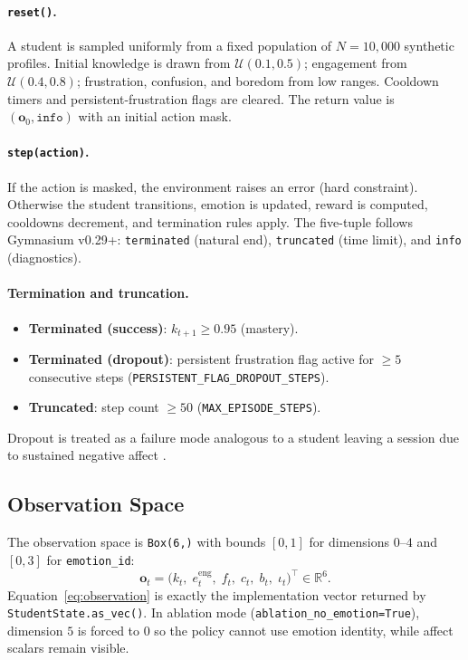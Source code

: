\paragraph{\texttt{reset()}.}
A student is sampled uniformly from a fixed population of $N=10{,}000$ synthetic profiles. Initial knowledge is drawn from $\mathcal{U}(0.1, 0.5)$; engagement from $\mathcal{U}(0.4, 0.8)$; frustration, confusion, and boredom from low ranges. Cooldown timers and persistent-frustration flags are cleared. The return value is $(\mathbf{o}_0, \texttt{info})$ with an initial action mask.

\paragraph{\texttt{step(action)}.}
If the action is masked, the environment raises an error (hard constraint). Otherwise the student transitions, emotion is updated, reward is computed, cooldowns decrement, and termination rules apply. The five-tuple follows Gymnasium v0.29+: \texttt{terminated} (natural end), \texttt{truncated} (time limit), and \texttt{info} (diagnostics).

\paragraph{Termination and truncation.}
\begin{itemize}
    \item \textbf{Terminated (success)}: $k_{t+1} \geq 0.95$ (mastery).
    \item \textbf{Terminated (dropout)}: persistent frustration flag active for $\geq 5$ consecutive steps (\texttt{PERSISTENT\_FLAG\_DROPOUT\_STEPS}).
    \item \textbf{Truncated}: step count $\geq 50$ (\texttt{MAX\_EPISODE\_STEPS}).
\end{itemize}
Dropout is treated as a failure mode analogous to a student leaving a session due to sustained negative affect \cite{dmello_language_2012,govea_implementation_2024}.

\subsection{Observation Space}\label{sec:method_observation}

The observation space is \texttt{Box(6,)} with bounds $[0,1]$ for dimensions $0$--$4$ and $[0,3]$ for \texttt{emotion\_id}:
\begin{equation}
    \mathbf{o}_t = \bigl(k_t,\; e^{\mathrm{eng}}_t,\; f_t,\; c_t,\; b_t,\; \iota_t\bigr)^\top \in \mathbb{R}^6.
    \label{eq:observation}
\end{equation}
Equation~\eqref{eq:observation} is exactly the implementation vector returned by \texttt{StudentState.as\_vec()}. In ablation mode (\texttt{ablation\_no\_emotion=True}), dimension $5$ is forced to $0$ so the policy cannot use emotion identity, while affect scalars remain visible.

